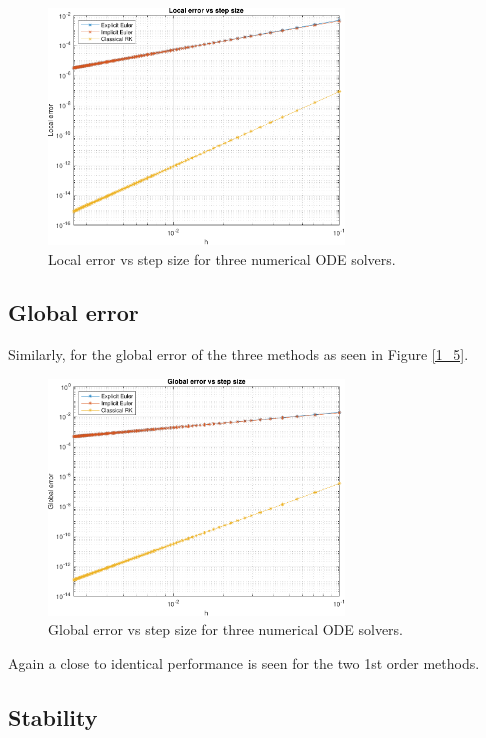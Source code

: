 \begin{figure}[H]
    \centering
    \includegraphics[width=0.7\textwidth]{plots/1_4.pdf}
    \caption{Local error vs step size for three numerical ODE solvers.}
    \label{fig:1_4}
\end{figure}



\subsection{Global error}
Similarly, for the global error of the three methods as seen in Figure \ref{1_5}.

\begin{figure}[H]
    \centering
    \includegraphics[width=0.7\textwidth]{plots/1_5.pdf}
    \caption{Global error vs step size for three numerical ODE solvers.}
    \label{fig:1_5}
\end{figure}

Again a close to identical performance is seen for the two 1st order methods.

\subsection{Stability}